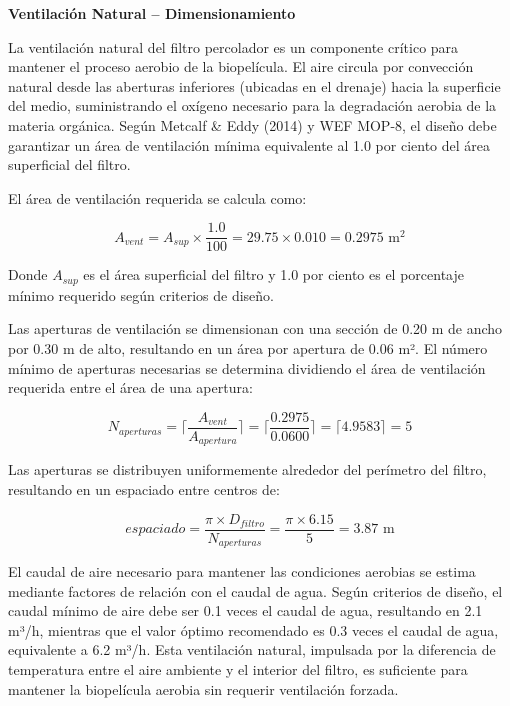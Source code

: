 \documentclass[12pt,a4paper]{article}
\begin{document}
\textbf{Ventilación Natural -- Dimensionamiento}

La ventilación natural del filtro percolador es un componente crítico para mantener el proceso aerobio de la biopelícula. El aire circula por convección natural desde las aberturas inferiores (ubicadas en el drenaje) hacia la superficie del medio, suministrando el oxígeno necesario para la degradación aerobia de la materia orgánica. Según Metcalf \& Eddy (2014) y WEF MOP-8, el diseño debe garantizar un área de ventilación mínima equivalente al 1.0 por ciento del área superficial del filtro.

El área de ventilación requerida se calcula como:

\begin{equation}
A_{vent} = A_{sup} \times \frac{1.0}{100} = 29.75 \times 0.010 = 0.2975 \text{ m}^2
\end{equation}

Donde $A_{sup}$ es el área superficial del filtro y 1.0 por ciento es el porcentaje mínimo requerido según criterios de diseño.

Las aperturas de ventilación se dimensionan con una sección de 0.20 m de ancho por 0.30 m de alto, resultando en un área por apertura de 0.06 m². El número mínimo de aperturas necesarias se determina dividiendo el área de ventilación requerida entre el área de una apertura:

\begin{equation}
N_{aperturas} = \lceil\frac{A_{vent}}{A_{apertura}}\rceil = \lceil\frac{0.2975}{0.0600}\rceil = \lceil4.9583\rceil = 5
\end{equation}

Las aperturas se distribuyen uniformemente alrededor del perímetro del filtro, resultando en un espaciado entre centros de:

\begin{equation}
espaciado = \frac{\pi \times D_{filtro}}{N_{aperturas}} = \frac{\pi \times 6.15}{5} = 3.87 \text{ m}
\end{equation}

El caudal de aire necesario para mantener las condiciones aerobias se estima mediante factores de relación con el caudal de agua. Según criterios de diseño, el caudal mínimo de aire debe ser 0.1 veces el caudal de agua, resultando en 2.1 m³/h, mientras que el valor óptimo recomendado es 0.3 veces el caudal de agua, equivalente a 6.2 m³/h. Esta ventilación natural, impulsada por la diferencia de temperatura entre el aire ambiente y el interior del filtro, es suficiente para mantener la biopelícula aerobia sin requerir ventilación forzada.
\end{document}
